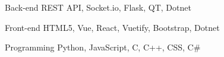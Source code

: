 

\begin{cvskills}

  \cvskill
    {Back-end} %
    {REST API, Socket.io, Flask, QT, Dotnet} %

  \cvskill
    {Front-end} %
    {HTML5, Vue, React, Vuetify, Bootstrap, Dotnet} %

  \cvskill
    {Programming} %
    {Python, JavaScript, C, C++, CSS, C\#} %

\end{cvskills}